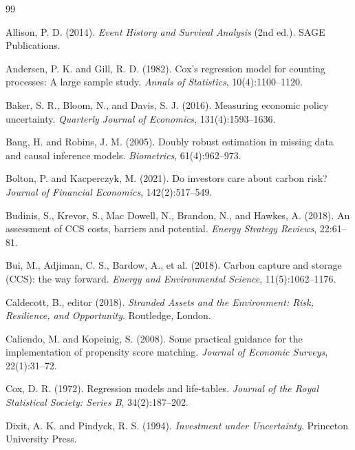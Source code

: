 \documentclass[11pt,a4paper]{article}
\begin{document}
\renewcommand{\bibname}{References}
\begin{thebibliography}{99}

Allison, P. D. (2014). \textit{Event History and Survival Analysis} (2nd ed.). SAGE Publications.

Andersen, P. K. and Gill, R. D. (1982). Cox's regression model for counting processes: A large sample study. \textit{Annals of Statistics}, 10(4):1100--1120.

Baker, S. R., Bloom, N., and Davis, S. J. (2016). Measuring economic policy uncertainty. \textit{Quarterly Journal of Economics}, 131(4):1593--1636.

Bang, H. and Robins, J. M. (2005). Doubly robust estimation in missing data and causal inference models. \textit{Biometrics}, 61(4):962--973.

Bolton, P. and Kacperczyk, M. (2021). Do investors care about carbon risk? \textit{Journal of Financial Economics}, 142(2):517--549.

Budinis, S., Krevor, S., Mac Dowell, N., Brandon, N., and Hawkes, A. (2018). An assessment of CCS costs, barriers and potential. \textit{Energy Strategy Reviews}, 22:61--81.

Bui, M., Adjiman, C. S., Bardow, A., et al. (2018). Carbon capture and storage (CCS): the way forward. \textit{Energy and Environmental Science}, 11(5):1062--1176.

Caldecott, B., editor (2018). \textit{Stranded Assets and the Environment: Risk, Resilience, and Opportunity}. Routledge, London.

Caliendo, M. and Kopeinig, S. (2008). Some practical guidance for the implementation of propensity score matching. \textit{Journal of Economic Surveys}, 22(1):31--72.

Cox, D. R. (1972). Regression models and life-tables. \textit{Journal of the Royal Statistical Society: Series B}, 34(2):187--202.

Dixit, A. K. and Pindyck, R. S. (1994). \textit{Investment under Uncertainty}. Princeton University Press.


\end{thebibliography}
\end{document}
